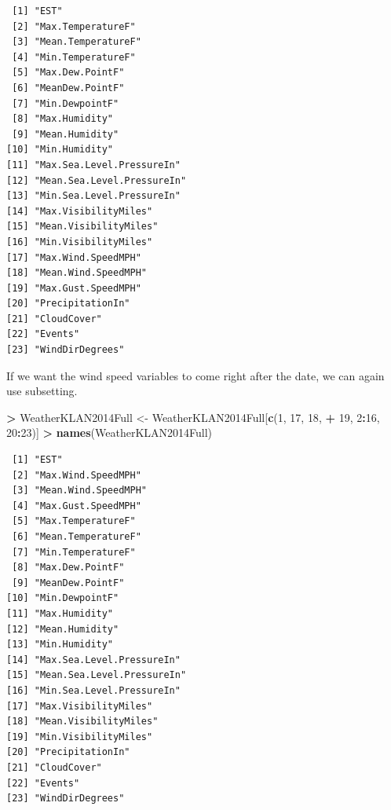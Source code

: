 \documentclass[]{krantz}
\makeatletter
\newenvironment{Shaded}{\begin{snugshade}}{\end{snugshade}}
\newcommand{\DecValTok}[1]{\textcolor[rgb]{0.06,0.06,0.06}{#1}}
\newcommand{\KeywordTok}[1]{\textcolor[rgb]{0.27,0.27,0.27}{\textbf{#1}}}
\newcommand{\NormalTok}[1]{#1}
\newcommand{\OperatorTok}[1]{\textcolor[rgb]{0.43,0.43,0.43}{\textbf{#1}}}
\newcommand{\StringTok}[1]{\textcolor[rgb]{0.5,0.5,0.5}{#1}}
\newenvironment{kframe}{%
\medskip{}
\setlength{\fboxsep}{.8em}
 \def\at@end@of@kframe{}%
 \ifinner\ifhmode%
  \def\at@end@of@kframe{\end{minipage}}%
  \begin{minipage}{\columnwidth}%
 \fi\fi%
 \def\FrameCommand##1{\hskip\@totalleftmargin \hskip-\fboxsep
 \colorbox{shadecolor}{##1}\hskip-\fboxsep
     \hskip-\linewidth \hskip-\@totalleftmargin \hskip\columnwidth}%
 \MakeFramed {\advance\hsize-\width
   \@totalleftmargin\z@ \linewidth\hsize
   \@setminipage}}%
 {\par\unskip\endMakeFramed%
 \at@end@of@kframe}
\renewenvironment{Shaded}{\begin{kframe}}{\end{kframe}}
\makeatother
\begin{document}
\begin{verbatim}
 [1] "EST"                      
 [2] "Max.TemperatureF"         
 [3] "Mean.TemperatureF"        
 [4] "Min.TemperatureF"         
 [5] "Max.Dew.PointF"           
 [6] "MeanDew.PointF"           
 [7] "Min.DewpointF"            
 [8] "Max.Humidity"             
 [9] "Mean.Humidity"            
[10] "Min.Humidity"             
[11] "Max.Sea.Level.PressureIn" 
[12] "Mean.Sea.Level.PressureIn"
[13] "Min.Sea.Level.PressureIn" 
[14] "Max.VisibilityMiles"      
[15] "Mean.VisibilityMiles"     
[16] "Min.VisibilityMiles"      
[17] "Max.Wind.SpeedMPH"        
[18] "Mean.Wind.SpeedMPH"       
[19] "Max.Gust.SpeedMPH"        
[20] "PrecipitationIn"          
[21] "CloudCover"               
[22] "Events"                   
[23] "WindDirDegrees"           
\end{verbatim}

If we want the wind speed variables to come right after the date, we can again use subsetting.

\begin{Shaded}
\begin{Highlighting}[]
\OperatorTok{>}\StringTok{ }\NormalTok{WeatherKLAN2014Full <-}\StringTok{ }\NormalTok{WeatherKLAN2014Full[}\KeywordTok{c}\NormalTok{(}\DecValTok{1}\NormalTok{, }\DecValTok{17}\NormalTok{, }\DecValTok{18}\NormalTok{, }
\OperatorTok{+}\StringTok{   }\DecValTok{19}\NormalTok{, }\DecValTok{2}\OperatorTok{:}\DecValTok{16}\NormalTok{, }\DecValTok{20}\OperatorTok{:}\DecValTok{23}\NormalTok{)]}
\OperatorTok{>}\StringTok{ }\KeywordTok{names}\NormalTok{(WeatherKLAN2014Full)}
\end{Highlighting}
\end{Shaded}

\begin{verbatim}
 [1] "EST"                      
 [2] "Max.Wind.SpeedMPH"        
 [3] "Mean.Wind.SpeedMPH"       
 [4] "Max.Gust.SpeedMPH"        
 [5] "Max.TemperatureF"         
 [6] "Mean.TemperatureF"        
 [7] "Min.TemperatureF"         
 [8] "Max.Dew.PointF"           
 [9] "MeanDew.PointF"           
[10] "Min.DewpointF"            
[11] "Max.Humidity"             
[12] "Mean.Humidity"            
[13] "Min.Humidity"             
[14] "Max.Sea.Level.PressureIn" 
[15] "Mean.Sea.Level.PressureIn"
[16] "Min.Sea.Level.PressureIn" 
[17] "Max.VisibilityMiles"      
[18] "Mean.VisibilityMiles"     
[19] "Min.VisibilityMiles"      
[20] "PrecipitationIn"          
[21] "CloudCover"               
[22] "Events"                   
[23] "WindDirDegrees"           
\end{verbatim}
\end{document}

